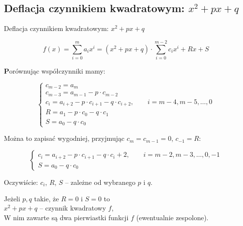\subsection{Deflacja czynnikiem kwadratowym: $ x^2 +px + q $}

\begin{frame}{Deflacja czynnikiem kwadratowym: $ x^2 +px + q $}
  \begin{block}{}
    $$ f(x) = \sum_{i=0}^m a_i x^i = (x^2 + px + q) \cdot \sum_{i=0}^{m-2} c_i x^i + Rx +S $$
  \end{block}

  \vspace{6mm}

  \textbf Porównując  współczynniki mamy:

  $$ \left \{ \begin{array}{l}
  c_{m-2} = a_m \\
  c_{m-3} = a_{m-1} - p \cdot c_{m-2} \\
  c_i = a_{i+2} - p \cdot c_{i+1} - q \cdot c_{i + 2}, \qquad i = m - 4, m - 5, \dots , 0 \\
  R = a_1 - p \cdot c_0 - q \cdot c_1 \\
  S = a_0 - q \cdot c_0
  \end{array} \right. $$
\end{frame}

\begin{frame}
  Można to zapisać wygodniej, przyjmując $ c_m = c_{m-1} = 0 $, $ c_{-1} = R $:

  \begin{block}{}
    $$ \left \{ \begin{array}{l}
    c_i = a_{i+2} - p \cdot c_{i+1} - q \cdot c_i + 2, \qquad i = m-2, m-3, \dots , 0, -1 \\
    S = a_0 - q \cdot c_0
    \end{array} \right. $$
  \end{block}


  \vspace{5px}

  Oczywiście: $c_i$, $R$, $S$ -- zależne od wybranego $p$ i $q$.

  \vspace{5px}

  Jeżeli $p,q$ takie, że $R = 0$ i $S = 0$ to \\ $x^2 + px + q$ -- czynnik kwadratowy $f$, \\W nim zawarte są dwa pierwiastki funkcji $f$ (ewentualnie zespolone).
\end{frame}
